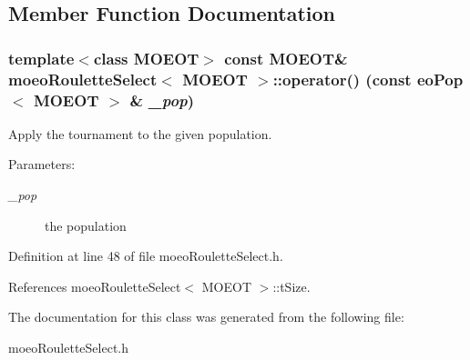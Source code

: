 \subsection{Member Function Documentation}
\subsubsection{\setlength{\rightskip}{0pt plus 5cm}template$<$class MOEOT$>$ const MOEOT\& \bf{moeo\-Roulette\-Select}$<$ MOEOT $>$::operator() (const \bf{eo\-Pop}$<$ MOEOT $>$ \& {\em \_\-pop})\hspace{0.3cm}{\tt  [inline]}}\label{classmoeoRouletteSelect_573fe156daf6fdfbae96d2b54a9fc260}


Apply the tournament to the given population. 

\begin{Desc}
\item[Parameters:]
\begin{description}
\item[{\em \_\-pop}]the population \end{description}
\end{Desc}


Definition at line 48 of file moeo\-Roulette\-Select.h.

References moeo\-Roulette\-Select$<$ MOEOT $>$::t\-Size.

The documentation for this class was generated from the following file:\begin{CompactItemize}
\item 
moeo\-Roulette\-Select.h\end{CompactItemize}
